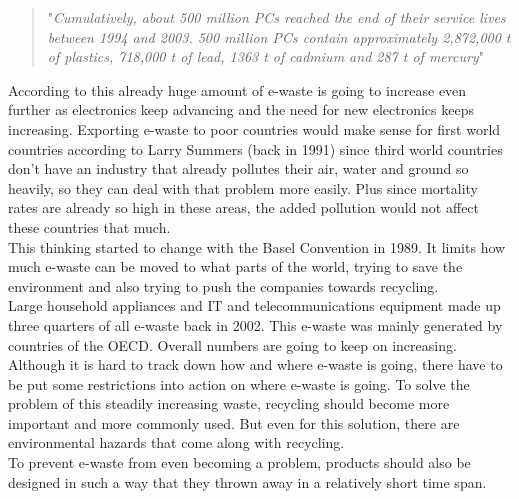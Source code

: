 \begin{quotation}
  "\textit{Cumulatively, about 500 million PCs reached the end of their service lives between 1994 and 2003. 500 million PCs contain approximately 2,872,000 t of plastics, 718,000 t of lead, 1363 t of cadmium and 287 t of mercury}" \cite{global-perspective}\\
  
\end{quotation}

According to \cite{global-perspective} this already huge amount of e-waste is going to increase even further as electronics keep advancing and the need for new electronics keeps increasing. Exporting e-waste to poor countries would make sense for first world countries according to Larry Summers (back in 1991) since third world countries don't have an industry that already pollutes their air, water and ground so heavily, so they can deal with that problem more easily. Plus since mortality rates are already so high in these areas, the added pollution would not affect these countries that much.\\
This thinking started to change with the Basel Convention in 1989. It limits how much e-waste can be moved to what parts of the world, trying to save the environment and also trying to push the companies towards recycling. \\

Large household appliances and IT and telecommunications equipment made up three quarters of all e-waste back in 2002. This e-waste was mainly generated by countries of the OECD. Overall numbers are going to keep on increasing.\\

Although it is hard to track down how and where e-waste is going, there have to be put some restrictions into action on where e-waste is going. To solve the problem of this steadily increasing waste, recycling should become more important and more commonly used. But even for this solution, there are environmental hazards that come along with recycling.\\
To prevent e-waste from even becoming a problem, products should also be designed in such a way that they thrown away in a relatively short time span. 